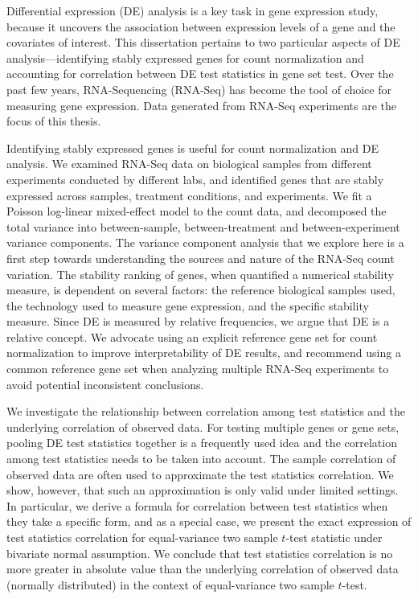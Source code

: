 
Differential expression (DE) analysis is a key task in gene expression study, because it uncovers 
the association between expression levels of a gene and the covariates of interest.
This dissertation pertains to two particular aspects of DE analysis---identifying stably expressed 
genes for count normalization and accounting for correlation between DE test statistics in gene set 
test. Over the past few years, RNA-Sequencing (RNA-Seq) has become the tool of choice for measuring 
gene expression. Data generated from RNA-Seq experiments are the focus of this thesis. 

Identifying stably expressed genes is useful for count normalization and DE analysis. We examined 
RNA-Seq data on \howmanySamples biological samples from \howmanylab different experiments conducted 
by different labs, and identified genes that are stably expressed across samples, treatment 
conditions, and experiments. We fit a Poisson log-linear mixed-effect model to the count data, and 
decomposed the total variance into between-sample, between-treatment and between-experiment 
variance components. The variance 
component analysis that we explore here is a first step towards understanding the sources and 
nature of the RNA-Seq count variation. The stability ranking of genes, when quantified a numerical 
stability measure, is dependent on several factors: the reference biological samples used, the 
technology used to measure gene expression, and the specific stability measure. Since DE is 
measured by relative frequencies, we argue that DE is a relative concept. We advocate using an 
explicit reference gene set for count normalization to improve interpretability of DE results, and 
recommend using a common reference gene set when analyzing multiple RNA-Seq experiments to avoid 
potential inconsistent conclusions.


We investigate the relationship between correlation among test statistics and the underlying 
correlation of observed data. For testing multiple genes or gene sets, pooling DE test 
statistics together is a frequently used idea and the correlation among test statistics needs to be 
taken into account. The sample correlation of observed data are often used to approximate the 
test statistics correlation. We show, however, that such an approximation is only valid under 
limited settings. In particular, we derive a formula for correlation between test statistics when 
they take a specific form, and as a special case, we present the exact expression of test 
statistics correlation for equal-variance two sample $t$-test statistic under bivariate 
normal assumption. We conclude that test statistics correlation is no more greater in absolute 
value than the underlying correlation of observed data (normally distributed) in the context of 
equal-variance two sample $t$-test.

